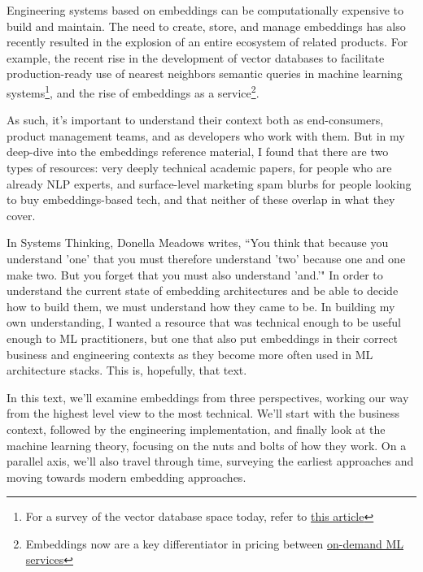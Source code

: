 \documentclass[11pt, table]{diazessay} %
\begin{document}
\begin{sloppypar}
Engineering systems based on embeddings can be computationally expensive to build and maintain\citep{sharir2020cost}. The need to create, store, and manage embeddings has also recently resulted in the explosion of an entire ecosystem of related products. For example, the recent rise in the development of vector databases to facilitate production-ready use of nearest neighbors semantic queries in machine learning systems\footnote{For a survey of the vector database space today, refer to  \href{https://dmitry-kan.medium.com/landscape-of-vector-databases-d241b279f486}{this article}}, and the rise of embeddings as a service\footnote{Embeddings now are a key differentiator in pricing between \href{https://openai.com/pricing}{on-demand ML services}}.

As such, it's important to understand their context both as end-consumers, product management teams, and as developers who work with them. But in my deep-dive into the embeddings reference material, I found that there are two types of resources: very deeply technical academic papers, for people who are already NLP experts, and surface-level marketing spam blurbs for people looking to buy embeddings-based tech, and that neither of these overlap in what they cover.  

In Systems Thinking, Donella Meadows writes, “You think that because you understand 'one' that you must therefore understand 'two' because one and one make two. But you forget that you must also understand 'and.'"\citep{meadows2008thinking} In order to understand the current state of embedding architectures and be able to decide how to build them, we must understand how they came to be. In building my own understanding, I wanted a resource that was technical enough to be useful enough to ML practitioners, but one that also put embeddings in their correct business and engineering contexts as they become more often used in ML architecture stacks. This is, hopefully, that text.

In this text, we'll examine embeddings from three perspectives, working our way from the highest level view to the most technical. We'll start with the business context, followed by the engineering implementation, and finally look at the machine learning theory, focusing on the nuts and bolts of how they work. On a parallel axis, we'll also travel through time, surveying the earliest approaches and moving towards modern embedding approaches.  


\end{sloppypar}
\end{document}
